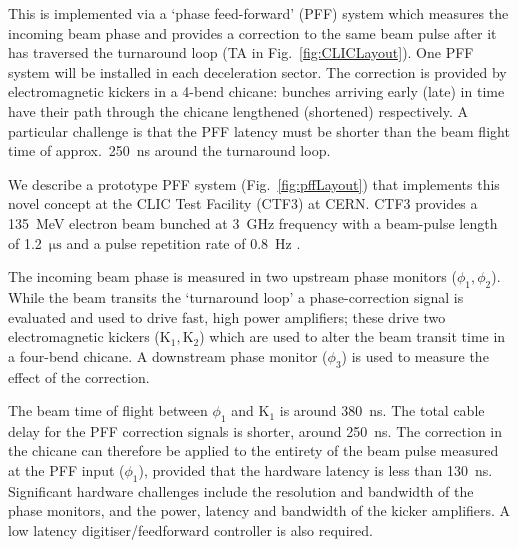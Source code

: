 \documentclass[%
 reprint,
 superscriptaddress,
 amsmath,
 amssymb,
 prl,
]{revtex4-1}
\begin{document}
This is implemented via a `phase feed-forward' (PFF) system which measures the 
incoming beam phase and provides a correction to the same beam pulse 
after it has traversed the turnaround loop (TA in Fig.~\ref{fig:CLICLayout}). 
One PFF system will be installed in each deceleration sector. The correction 
is provided by electromagnetic kickers in a 4-bend chicane: bunches arriving 
early (late) in time have their path through the chicane lengthened (shortened) 
respectively. A particular challenge is that the PFF latency must be shorter 
than the beam flight time of approx.~250~ns around the turnaround loop.

We describe a prototype PFF system (Fig.~\ref{fig:pffLayout}) that implements 
this novel concept at the CLIC Test Facility (CTF3) at CERN. CTF3 provides a 
135~MeV electron beam bunched at 3~GHz frequency with a beam-pulse length of 
1.2~\(\mathrm{\mu s}\) and a pulse repetition rate of 0.8~Hz \cite{CLICCDR}. 

The incoming beam phase is measured in two upstream phase 
monitors (\(\phi_{1}, \phi_{2}\)). While the beam 
transits the ‘turnaround loop’ a phase-correction signal is evaluated and used 
to drive fast, high power amplifiers; these drive two electromagnetic kickers 
(\(\mathrm{K_1, K_2}\)) which are used to alter the beam transit time in a 
four-bend chicane. A downstream phase monitor (\(\phi_{3}\)) is 
used to measure the effect of the correction. 

The beam time of flight between \(\phi_1\) and \(\mathrm{K_1}\) is around 
380~ns. The total cable delay for the PFF correction signals 
is shorter, around 250~ns. The correction in the chicane can therefore be 
applied to the entirety of the beam pulse measured at the PFF input 
(\(\phi_1\)), provided that the hardware latency is less than 130~ns. 
Significant hardware challenges include the resolution and bandwidth of the 
phase monitors, and the power, latency and bandwidth of the kicker amplifiers. 
A low latency digitiser/feedforward controller is also required.
 
\end{document}
